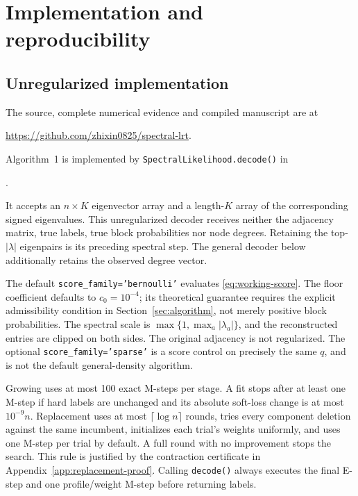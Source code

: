 \documentclass[11pt]{article}
\theoremstyle{definition}
\theoremstyle{remark}
\numberwithin{equation}{section}
\begin{document}
\section{Implementation and reproducibility}
\label{app:implementation}

\subsection{Unregularized implementation}
The source, complete numerical evidence and compiled manuscript are at
\begin{center}
\url{https://github.com/zhixin0825/spectral-lrt}.
\end{center}
Algorithm~1 is implemented by \texttt{SpectralLikelihood.decode()} in
\begin{center}
\small{}.
\end{center}
It accepts an $n\times K$ eigenvector array and a length-$K$ array of the corresponding signed eigenvalues. This unregularized decoder receives neither the adjacency matrix, true labels, true block probabilities nor node degrees. Retaining the top-$|\lambda|$ eigenpairs is its preceding spectral step. The general decoder below additionally retains the observed degree vector.

The default \texttt{score\_family='bernoulli'} evaluates \eqref{eq:working-score}. The floor coefficient defaults to $c_0=10^{-4}$; its theoretical guarantee requires the explicit admissibility condition in Section~\ref{sec:algorithm}, not merely positive block probabilities. The spectral scale is $\max\{1,\max_a|\lambda_a|\}$, and the reconstructed entries are clipped on both sides. The original adjacency is not regularized. The optional \texttt{score\_family='sparse'} is a score control on precisely the same $q$, and is not the default general-density algorithm.

Growing uses at most 100 exact M-steps per stage. A fit stops after at least one M-step if hard labels are unchanged and its absolute soft-loss change is at most $10^{-9}n$. Replacement uses at most $\lceil\log n\rceil$ rounds, tries every component deletion against the same incumbent, initializes each trial's weights uniformly, and uses one M-step per trial by default. A full round with no improvement stops the search. This rule is justified by the contraction certificate in Appendix~\ref{app:replacement-proof}. Calling \texttt{decode()} always executes the final E-step and one profile/weight M-step before returning labels.
\end{document}
